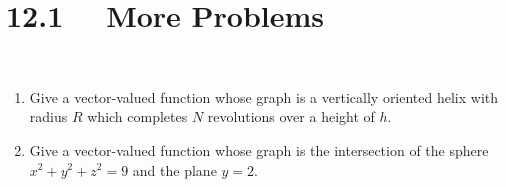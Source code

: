 \section*{12.1 \ \ More Problems}

\ 


\begin{enumerate}
\item  Give a vector-valued function whose graph is a vertically oriented helix with radius $R$ which completes $N$ revolutions over a height of $h$.\\

\item  Give a vector-valued function whose graph is the intersection of the sphere $x^2 + y^2 + z^2 = 9$ and the plane $y = 2$.\\


\end{enumerate}
